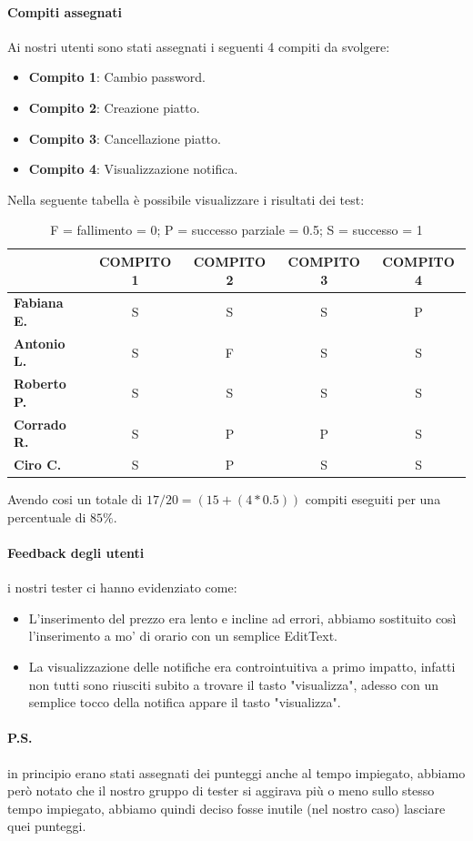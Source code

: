 \paragraph{Compiti assegnati} Ai nostri utenti sono stati assegnati i seguenti 4 compiti da svolgere:
\begin{itemize}
  \item \textbf{Compito 1}: Cambio password.
  \item \textbf{Compito 2}: Creazione piatto.
  \item \textbf{Compito 3}: Cancellazione piatto.
  \item \textbf{Compito 4}: Visualizzazione notifica.
\end{itemize}
Nella seguente tabella è possibile visualizzare i risultati dei test:
\begin{table}[H]
  \begin{center}
    \def\arraystretch{1.5}
    \begin{tabular}{|l|c|c|c|c|}
      \hline
      &\textbf{COMPITO 1} & \textbf{COMPITO 2} & \textbf{COMPITO 3} & \textbf{COMPITO 4} \\
      \hline
      \textbf{Fabiana E.} & S                & S              & S                  & P                \\
      \hline
      \textbf{Antonio L.} & S                & F              & S                  & S                \\
      \hline
      \textbf{Roberto P.} & S                & S              & S                  & S                \\
      \hline
      \textbf{Corrado R.} & S                & P              & P                  & S                \\
      \hline
      \textbf{Ciro C.} & S                & P              & S                  & S                \\
      \hline
    \end{tabular}
  \end{center}
  \caption{F = fallimento = 0; P = successo parziale = 0.5; S = successo = 1}
\end{table}
Avendo cosi un totale di $17/20 = (15+(4*0.5))$ compiti eseguiti per una percentuale di $85\%$.
\paragraph{Feedback degli utenti} i nostri tester ci hanno evidenziato come:
\begin{itemize}
  \item L'inserimento del prezzo era lento e incline ad errori, abbiamo sostituito così l'inserimento a mo' di orario con un semplice EditText.
  \item La visualizzazione delle notifiche era controintuitiva a primo impatto, infatti non tutti sono riusciti subito a trovare il tasto "visualizza", adesso con un semplice tocco della notifica appare il tasto "visualizza". 
\end{itemize} 
\paragraph{P.S.} in principio erano stati assegnati dei punteggi anche al tempo impiegato, abbiamo però notato che il nostro gruppo di tester si aggirava più o meno sullo stesso tempo impiegato, abbiamo quindi deciso fosse inutile (nel nostro caso) lasciare quei punteggi.